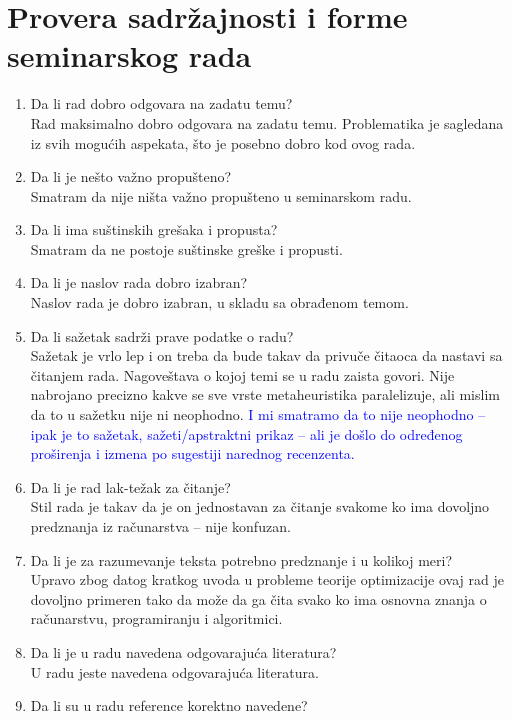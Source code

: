 \documentclass[a4paper]{report}
\newcommand{\odgovor}[1]{\textcolor{blue}{#1}}
\begin{document}
\section{Provera sadržajnosti i forme seminarskog rada}

\begin{enumerate}
\item Da li rad dobro odgovara na zadatu temu?\\ 
  Rad maksimalno dobro odgovara na zadatu temu. Problematika je sagledana iz svih mogućih aspekata, što je posebno dobro kod ovog rada.
\item Da li je nešto važno propušteno?\\ 
  Smatram da nije ništa važno propušteno u seminarskom radu.
\item Da li ima suštinskih grešaka i propusta?\\ 
  Smatram da ne postoje suštinske greške i propusti.
\item Da li je naslov rada dobro izabran?\\ 
  Naslov rada je dobro izabran, u skladu sa obrađenom temom.
\item Da li sažetak sadrži prave podatke o radu?\\ 
  Sažetak je vrlo lep i on treba da bude takav da privuče čitaoca da nastavi sa čitanjem rada. Nagoveštava o kojoj temi se u radu zaista govori. Nije nabrojano precizno kakve se sve vrste metaheuristika paralelizuje, ali mislim da to u sažetku nije ni neophodno. \odgovor{I mi smatramo da to nije neophodno -- ipak je to sažetak, sažeti/apstraktni prikaz -- ali je došlo do određenog proširenja i izmena po sugestiji narednog recenzenta.}
\item Da li je rad lak-težak za čitanje?\\ 
  Stil rada je takav da je on jednostavan za čitanje svakome ko ima dovoljno predznanja iz računarstva -- nije konfuzan.
\item Da li je za razumevanje teksta potrebno predznanje i u kolikoj meri?\\
  Upravo zbog datog kratkog uvoda u probleme teorije optimizacije ovaj rad je dovoljno primeren tako da može da ga čita svako ko ima osnovna znanja o računarstvu, programiranju i algoritmici.
\item Da li je u radu navedena odgovarajuća literatura?\\
  U radu jeste navedena odgovarajuća literatura.
\item Da li su u radu reference korektno navedene?\\

\end{enumerate}
\end{document}
